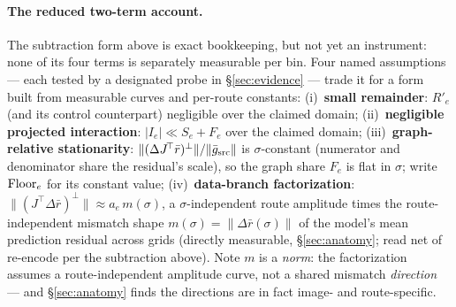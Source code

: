 \paragraph{The reduced two-term account.}
The subtraction form above is exact bookkeeping, but not yet an
instrument: none of its four terms is separately measurable per bin.
Four named assumptions --- each tested by a designated probe in
\S\ref{sec:evidence} --- trade it for a form built from measurable
curves and per-route constants:
(i)~\textbf{small remainder}: $R'_e$ (and its control counterpart)
negligible over the claimed domain;
(ii)~\textbf{negligible projected interaction}:
$|I_e| \ll S_e + F_e$ over the claimed domain;
(iii)~\textbf{graph-relative stationarity}:
$\|(\Delta J^{\!\top}\bar r)^{\perp}\| / \|\bar g_{\mathrm{src}}\|$ is
$\sigma$-constant (numerator and denominator
share the residual's scale), so the graph share $F_e$ is flat in
$\sigma$; write $\mathrm{Floor}_e$ for its constant value;
(iv)~\textbf{data-branch factorization}:
$\|(J^{\!\top}\Delta\bar r)^{\perp}\| \approx a_e\, m(\sigma)$, a
$\sigma$-independent route amplitude times the route-independent
mismatch shape $m(\sigma) = \|\Delta \bar r(\sigma)\|$ of the model's
mean prediction residual across grids (directly measurable,
\S\ref{sec:anatomy}; read net of re-encode per the subtraction above).
Note $m$ is a \emph{norm}: the factorization assumes a
route-independent amplitude curve, not a shared mismatch
\emph{direction} --- and \S\ref{sec:anatomy} finds the directions are
in fact image- and route-specific.

